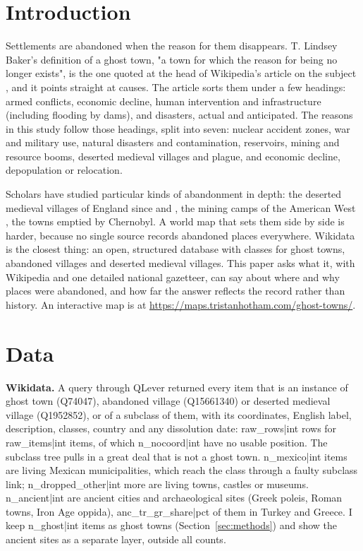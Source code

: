 \documentclass[11pt,a4paper]{article}
\begin{document}
\section{Introduction}
Settlements are abandoned when the reason for them disappears. T. Lindsey Baker's definition of a ghost town, "a town for which the reason for being no longer exists", is the one quoted at the head of Wikipedia's article on the subject \citep{wikighost}, and it points straight at causes. The article sorts them under a few headings: armed conflicts, economic decline, human intervention and infrastructure (including flooding by dams), and disasters, actual and anticipated. The reasons in this study follow those headings, split into seven: nuclear accident zones, war and military use, natural disasters and contamination, reservoirs, mining and resource booms, deserted medieval villages and plague, and economic decline, depopulation or relocation.

Scholars have studied particular kinds of abandonment in depth: the deserted medieval villages of England since \citet{beresford1954} and \citet{beresfordhurst1971}, the mining camps of the American West \citep{paul1963}, the towns emptied by Chernobyl. A world map that sets them side by side is harder, because no single source records abandoned places everywhere. Wikidata is the closest thing: an open, structured database with classes for ghost towns, abandoned villages and deserted medieval villages. This paper asks what it, with Wikipedia and one detailed national gazetteer, can say about where and why places were abandoned, and how far the answer reflects the record rather than history. An interactive map is at \url{https://maps.tristanhotham.com/ghost-towns/}.

\section{Data}
\textbf{Wikidata.} A query through QLever returned every item that is an instance of ghost town (Q74047), abandoned village (Q15661340) or deserted medieval village (Q1952852), or of a subclass of them, with its coordinates, English label, description, classes, country and any dissolution date: {{raw_rows|int}} rows for {{raw_items|int}} items, of which {{n_nocoord|int}} have no usable position. The subclass tree pulls in a great deal that is not a ghost town. {{n_mexico|int}} items are living Mexican municipalities, which reach the class through a faulty subclass link; {{n_dropped_other|int}} more are living towns, castles or museums. {{n_ancient|int}} are ancient cities and archaeological sites (Greek poleis, Roman towns, Iron Age oppida), {{anc_tr_gr_share|pct}} of them in Turkey and Greece. I keep {{n_ghost|int}} items as ghost towns (Section~\ref{sec:methods}) and show the ancient sites as a separate layer, outside all counts.
\end{document}
